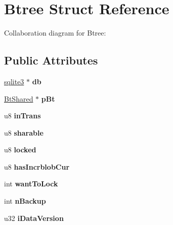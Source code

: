 \hypertarget{structBtree}{}\section{Btree Struct Reference}
\label{structBtree}


Collaboration diagram for Btree\+:
\subsection*{Public Attributes}
\begin{DoxyCompactItemize}
\item 
\hyperlink{structsqlite3}{sqlite3} $\ast$ {\bfseries db}\hypertarget{structBtree_a2b3cfec48b6e9fcfd641d433816ae5c3}{}\label{structBtree_a2b3cfec48b6e9fcfd641d433816ae5c3}

\item 
\hyperlink{structBtShared}{Bt\+Shared} $\ast$ {\bfseries p\+Bt}\hypertarget{structBtree_a63bab5d744d48d14368af048dddf2f20}{}\label{structBtree_a63bab5d744d48d14368af048dddf2f20}

\item 
u8 {\bfseries in\+Trans}\hypertarget{structBtree_a50007448960c05dfd1fdc7db3e277685}{}\label{structBtree_a50007448960c05dfd1fdc7db3e277685}

\item 
u8 {\bfseries sharable}\hypertarget{structBtree_a114f157127c76a1fbad8292e4b39c4dd}{}\label{structBtree_a114f157127c76a1fbad8292e4b39c4dd}

\item 
u8 {\bfseries locked}\hypertarget{structBtree_a16fc8292bae9a66cfec03f6cb82d06a8}{}\label{structBtree_a16fc8292bae9a66cfec03f6cb82d06a8}

\item 
u8 {\bfseries has\+Incrblob\+Cur}\hypertarget{structBtree_a247c6bd4123c5d53ebb96bd879047e25}{}\label{structBtree_a247c6bd4123c5d53ebb96bd879047e25}

\item 
int {\bfseries want\+To\+Lock}\hypertarget{structBtree_a97368ea300f0b74b8e80ea07da0cea2a}{}\label{structBtree_a97368ea300f0b74b8e80ea07da0cea2a}

\item 
int {\bfseries n\+Backup}\hypertarget{structBtree_a7a3e7cf38bc9c3021a9e270a54ecfb1e}{}\label{structBtree_a7a3e7cf38bc9c3021a9e270a54ecfb1e}

\item 
u32 {\bfseries i\+Data\+Version}\hypertarget{structBtree_a333e24a5c4340e94bad7aa13aa36ae31}{}\label{structBtree_a333e24a5c4340e94bad7aa13aa36ae31}


\end{DoxyCompactItemize}

